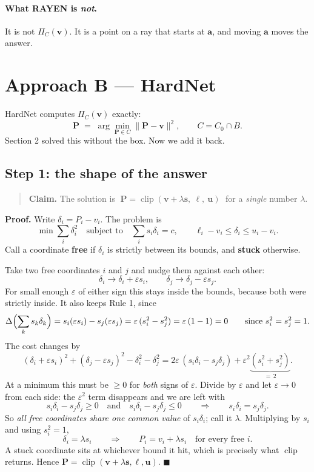 \documentclass[11pt]{article}
\begin{document}
\paragraph{What RAYEN is \emph{not}.} It is not $\Pi_C(\mathbf{v})$. It is a point
on a ray that starts at $\mathbf{a}$, and moving $\mathbf{a}$ moves the answer.

\section{Approach B --- HardNet}

HardNet computes $\Pi_C(\mathbf{v})$ exactly:
\[
\mathbf{P} \;=\; \arg\min_{\mathbf{P}\in C}\|\mathbf{P}-\mathbf{v}\|^{2},
\qquad C = C_0\cap B .
\]
Section 2 solved this without the box. Now we add it back.

\subsection*{Step 1: the shape of the answer}

\begin{quote}
\textbf{Claim.} The solution is
$\;\mathbf{P} = \operatorname{clip}(\mathbf{v}+\lambda\mathbf{s},\ \bm{\ell},\ \mathbf{u})\;$
for a \emph{single} number $\lambda$.
\end{quote}

\noindent\textbf{Proof.} Write $\delta_i = P_i - v_i$. The problem is
\[
\min \sum_i \delta_i^{2}
\quad\text{subject to}\quad
\sum_i s_i\delta_i = c,
\qquad
\ell_i - v_i \le \delta_i \le u_i - v_i .
\]
Call a coordinate \textbf{free} if $\delta_i$ is strictly between its bounds, and
\textbf{stuck} otherwise.

Take two free coordinates $i$ and $j$ and nudge them against each other:
\[
\delta_i \to \delta_i + \varepsilon s_i,
\qquad
\delta_j \to \delta_j - \varepsilon s_j .
\]
For small enough $\varepsilon$ of either sign this stays inside the bounds, because
both were strictly inside. It also keeps Rule 1, since
\[
\Delta\Bigl(\sum_k s_k\delta_k\Bigr)
= s_i(\varepsilon s_i) - s_j(\varepsilon s_j)
= \varepsilon\,(s_i^{2}-s_j^{2})
= \varepsilon\,(1-1) = 0 \qquad\text{since } s_i^{2}=s_j^{2}=1 .
\]
The cost changes by
\[
(\delta_i+\varepsilon s_i)^{2} + (\delta_j-\varepsilon s_j)^{2} - \delta_i^{2} - \delta_j^{2}
= 2\varepsilon\,(s_i\delta_i - s_j\delta_j) + \varepsilon^{2}\underbrace{(s_i^{2}+s_j^{2})}_{=\,2}.
\]
At a minimum this must be $\ge 0$ for \emph{both} signs of $\varepsilon$. Divide by
$\varepsilon$ and let $\varepsilon\to0$ from each side: the $\varepsilon^{2}$ term
disappears and we are left with
\[
s_i\delta_i - s_j\delta_j \ge 0
\quad\text{and}\quad
s_i\delta_i - s_j\delta_j \le 0
\qquad\Longrightarrow\qquad
s_i\delta_i = s_j\delta_j .
\]
So \emph{all free coordinates share one common value} of $s_i\delta_i$; call it
$\lambda$. Multiplying by $s_i$ and using $s_i^{2}=1$,
\[
\delta_i = \lambda s_i
\qquad\Longrightarrow\qquad
P_i = v_i + \lambda s_i \quad\text{for every free } i .
\]
A stuck coordinate sits at whichever bound it hit, which is precisely what
$\operatorname{clip}$ returns. Hence
$\mathbf{P}=\operatorname{clip}(\mathbf{v}+\lambda\mathbf{s},\bm{\ell},\mathbf{u})$.
\hfill$\blacksquare$
\end{document}
